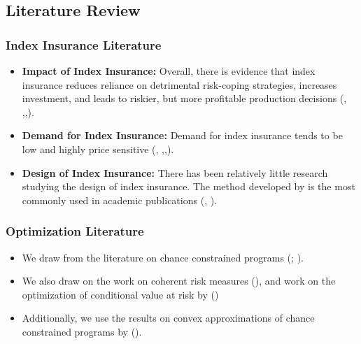 \documentclass[11pt]{article}
\begin{document}
  \subsection{Literature Review}
    \subsubsection{Index Insurance Literature}
        \begin{itemize}
            \item \textbf{Impact of Index Insurance:} Overall, there is evidence that index insurance reduces reliance on detrimental risk-coping strategies, increases investment, and leads to riskier, but more profitable production decisions (\cite{jensen2017agricultural}, \cite{cole2013barriers},\cite{mobarak2013informal},\cite{karlan2014agricultural}).
            \item \textbf{Demand for Index Insurance:} Demand for index insurance tends to be low and highly price sensitive (\cite{jensen2017agricultural}, \cite{cole2013barriers},\cite{cai2020subsidy},\cite{casaburi2018time}).
            \item \textbf{Design of Index Insurance:} There has been relatively little research studying the design of index insurance. The method developed by \cite{chantarat2013designing} is the most commonly used in academic publications (\cite{jensen2019does}, \cite{flatnes2018improving}).
        \end{itemize}

    \subsubsection{Optimization Literature}
        \begin{itemize}
            \item We draw from the literature on chance constrained programs (\cite{lagoa2005probabilistically}; \cite{charnes1958cost}).
            \item  We also draw on the work on coherent risk measures (\cite{artzner1999coherent}), and work on the optimization of conditional value at risk by (\cite{rockafellar2000optimization})
            \item Additionally, we use the results on convex approximations of chance constrained programs by (\cite{nemirovski2007convex}).
        \end{itemize}
\end{document}
